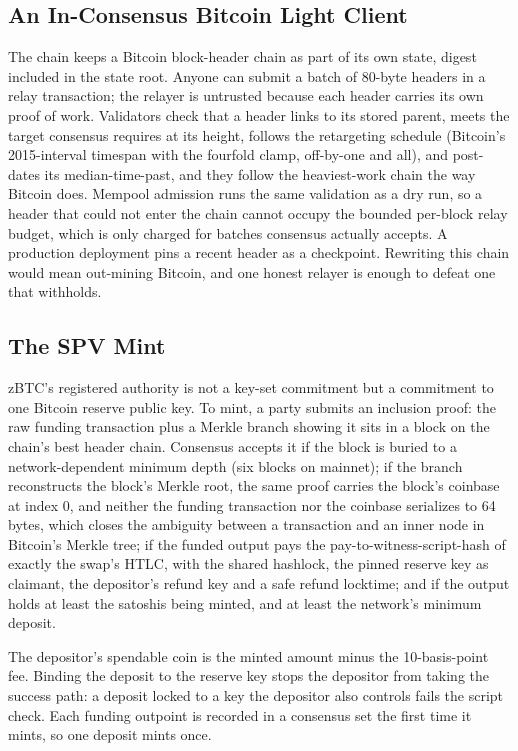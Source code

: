 \documentclass[twocolumn,10pt]{article}
\begin{document}
\subsection{An In-Consensus Bitcoin Light Client}

The chain keeps a Bitcoin block-header chain as part of its own state, digest included in the state root. Anyone can submit a batch of 80-byte headers in a relay transaction; the relayer is untrusted because each header carries its own proof of work. Validators check that a header links to its stored parent, meets the target consensus requires at its height, follows the retargeting schedule (Bitcoin's 2015-interval timespan with the fourfold clamp, off-by-one and all), and post-dates its median-time-past, and they follow the heaviest-work chain the way Bitcoin does. Mempool admission runs the same validation as a dry run, so a header that could not enter the chain cannot occupy the bounded per-block relay budget, which is only charged for batches consensus actually accepts. A production deployment pins a recent header as a checkpoint. Rewriting this chain would mean out-mining Bitcoin, and one honest relayer is enough to defeat one that withholds.

\subsection{The SPV Mint}

zBTC's registered authority is not a key-set commitment but a commitment to one Bitcoin reserve public key. To mint, a party submits an inclusion proof: the raw funding transaction plus a Merkle branch showing it sits in a block on the chain's best header chain. Consensus accepts it if the block is buried to a network-dependent minimum depth (six blocks on mainnet); if the branch reconstructs the block's Merkle root, the same proof carries the block's coinbase at index 0, and neither the funding transaction nor the coinbase serializes to 64 bytes, which closes the ambiguity between a transaction and an inner node in Bitcoin's Merkle tree; if the funded output pays the pay-to-witness-script-hash of exactly the swap's HTLC, with the shared hashlock, the pinned reserve key as claimant, the depositor's refund key and a safe refund locktime; and if the output holds at least the satoshis being minted, and at least the network's minimum deposit.

The depositor's spendable coin is the minted amount minus the 10-basis-point fee. Binding the deposit to the reserve key stops the depositor from taking the success path: a deposit locked to a key the depositor also controls fails the script check. Each funding outpoint is recorded in a consensus set the first time it mints, so one deposit mints once.
\end{document}
